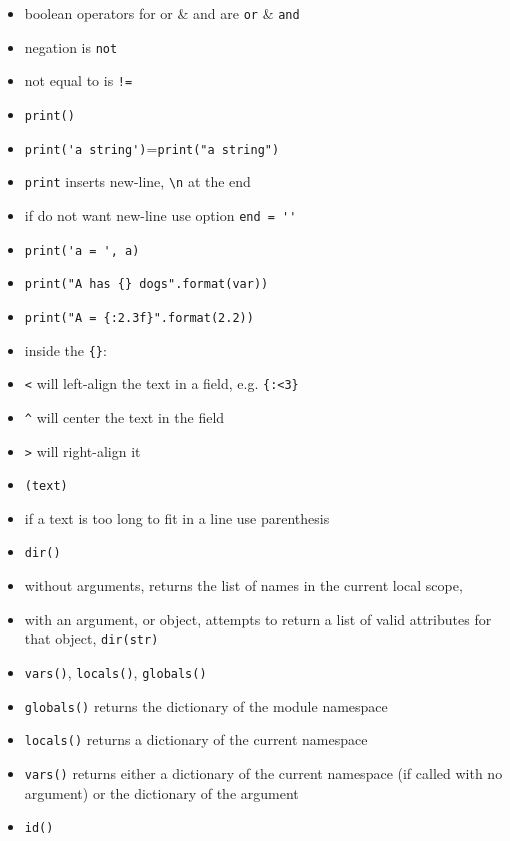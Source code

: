 \documentclass[onecolumn]{IEEEtran} %
\begin{document}
\begin{itemize}
        \item boolean operators for or \& and are \verb|or| \& \verb|and|
        \item negation is \verb|not|
        \item not equal to is \verb|!=|
    \ei
    \item \verb|print()|
    \bi
        \item \verb|print('a string')|=\verb|print("a string")|
        \item \verb|print| inserts new-line, \verb|\n| at the end
        \bi
            \item if do not want new-line use option \verb|end = ''|
        \ei
         \item \verb|print('a = ', a)|
        \item \verb|print("A has {} dogs".format(var))|
        \item \verb|print("A = {:2.3f}".format(2.2))|
        \item inside the \verb|{}|:
        \bi
            \item \verb|<| will left-align the text in a field,  e.g. \verb|{:<3}|
            \item \verb|^| will center the text in the field
            \item \verb|>| will right-align it
        \ei
    \ei
    \item \verb|(text)|
    \bi
        \item if a text is too long to fit in a line use parenthesis
    \ei
    \item \verb|dir()|
    \bi
        \item without arguments, returns the list of names in the current local scope,
        \item with an argument, or object, attempts to return a list of valid attributes for that object,
        \newline \verb|dir(str)|
    \ei
    \item \verb|vars()|, \verb|locals()|, \verb|globals()|
    \bi
        \item \verb|globals()| returns the dictionary of the module namespace
        \item \verb|locals()| returns a dictionary of the current namespace
        \item \verb|vars()| returns either a dictionary of the current namespace (if called with no argument) or the dictionary of the argument
    \ei
    \item \verb|id()|
    \bi

\end{itemize}
\end{document}
